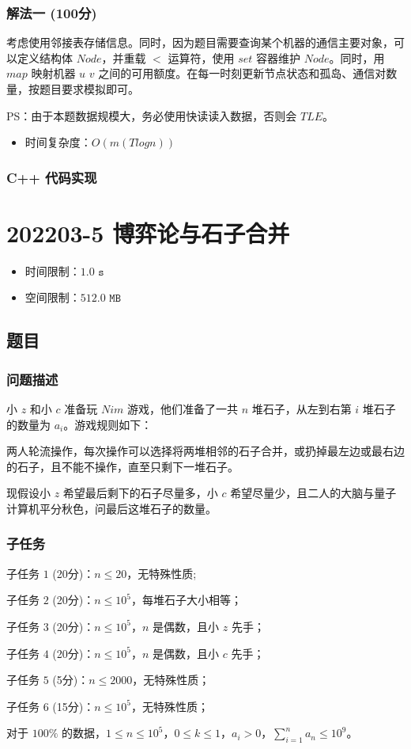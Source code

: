 \documentclass[UTF8, 12pt, a4paper, oneside]{ctexart}
\begin{document}
\subsubsection{解法一 (100分)}
\par 考虑使用邻接表存储信息。同时，因为题目需要查询某个机器的通信主要对象，可以定义结构体 $Node$，并重载 $<$ 运算符，使用 $set$ 容器维护 $Node$。同时，用 $map$ 映射机器 $u$ $v$ 之间的可用额度。在每一时刻更新节点状态和孤岛、通信对数量，按题目要求模拟即可。
\par PS：由于本题数据规模大，务必使用快读读入数据，否则会 $TLE$。
\begin{itemize}
    \item 时间复杂度：$O(m(Tlogn))$
\end{itemize}
\subsubsection{C++ 代码实现}



\section{202203-5 博弈论与石子合并}
\begin{itemize}
    \item 时间限制：$1.0\texttt{ s}$
    \item 空间限制：$512.0\texttt{ MB}$
\end{itemize}
\subsection{题目}
\subsubsection{问题描述}
\par 小 $z$ 和小 $c$ 准备玩 $Nim$ 游戏，他们准备了一共 $n$ 堆石子，从左到右第 $i$ 堆石子的数量为 $a_i$。游戏规则如下：
\par 两人轮流操作，每次操作可以选择将两堆相邻的石子合并，或扔掉最左边或最右边的石子，且不能不操作，直至只剩下一堆石子。
\par 现假设小 $z$ 希望最后剩下的石子尽量多，小 $c$ 希望尽量少，且二人的大脑与量子计算机平分秋色，问最后这堆石子的数量。
\subsubsection{子任务}
\par 子任务 $1$ (20分)：$n \leq 20$，无特殊性质;
\par 子任务 $2$ (20分)：$n \leq 10^5$，每堆石子大小相等；
\par 子任务 $3$ (20分)：$n \leq 10^5$，$n$ 是偶数，且小 $z$ 先手；
\par 子任务 $4$ (20分)：$n \leq 10^5$，$n$ 是偶数，且小 $c$ 先手；
\par 子任务 $5$ (5分)：$n \leq 2000$，无特殊性质；
\par 子任务 $6$ (15分)：$n \leq 10^5$，无特殊性质；
\par 对于 $100\%$ 的数据，$1 \leq n \leq 10^5$，$0 \leq k \leq 1$，$a_i > 0$，$\sum_{i = 1}^{n}a_n \leq 10^9$。
\end{document}

